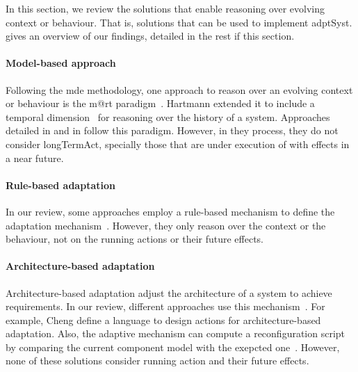 In this section, we review the solutions that enable reasoning over evolving context or \gls{behaviour}.
That is, solutions that can be used to implement \gls{adptSyst}.
 gives an overview of our findings, detailed in the rest if this section.

\paragraph{Model-based approach}
Following the \gls{mde} methodology, one approach to reason over an evolving context or \gls{behaviour} is the \gls{m@rt} paradigm~\cite{DBLP:journals/computer/BlairBF09, DBLP:journals/computer/MorinBJFS09}.
Hartmann \etal extended it to include a temporal dimension~\cite{DBLP:conf/seke/0001FNMKT14, DBLP:conf/models/0001FNMKBT14} for reasoning over the history of a system.
Approaches detailed in \cite{DBLP:conf/icse/BarbosaLMJ17} and in \cite{DBLP:conf/icse/ChenPYNZ14} follow this paradigm.
However, in they process, they do not consider \gls{longTermAct}, specially those that are under execution of with effects in a near future.

\paragraph{Rule-based adaptation}
In our review, some approaches employ a rule-based mechanism to define the adaptation mechanism~\cite{DBLP:conf/icse/ArcainiRS15, DBLP:conf/icse/TaharaOH17, DBLP:conf/eurosys/GraceHPBCT08}.
However, they only reason over the context or the behaviour, not on the running actions or their future effects.

\paragraph{Architecture-based adaptation}
Architecture-based adaptation adjust the architecture of a system to achieve requirements.
In our review, different approaches use this mechanism~\cite{DBLP:journals/jss/ChengG12, DBLP:journals/computer/GarlanCHSS04, DBLP:journals/computer/GeorgasHT09, DBLP:conf/cbse/FouquetMFBPJ12}.
For example, Cheng \etal define a language to design \glspl{action} for architecture-based adaptation.
Also, the adaptive mechanism can compute a reconfiguration script by comparing the current component model with the exepcted one~\cite{DBLP:conf/cbse/FouquetMFBPJ12}.
However, none of these solutions consider running \gls{action} and their future effects.

